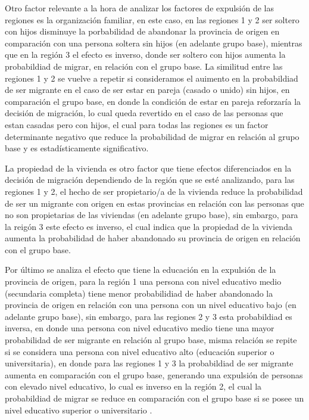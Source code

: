 \documentclass[12pt,a4paper]{article}
\begin{document}
Otro factor relevante a la hora de analizar los factores de expulsión de las regiones es la organización familiar, en este caso, en las regiones 1 y 2 ser soltero con hijos disminuye la porbabilidad de abandonar la provincia de origen en comparación con una persona soltera sin hijos (en adelante grupo base), mientras que en la región 3 el efecto es inverso, donde ser soltero con hijos aumenta la probabildiad de migrar, en relación con el grupo base.
La similitud entre las regiones 1 y 2 se vuelve a repetir si consideramos el auimento en la probabildiad de ser migrante en el caso de ser estar en pareja (casado o unido) sin hijos, en comparación el grupo base, en donde la condición de estar en pareja reforzaría la decisión de migración, lo cual queda revertido en el caso de las personas que estan casadas pero con hijos, el cual para todas las regiones es un factor determinante negativo que reduce la probabilidad de migrar en relación al grupo base y es estadísticamente significativo.

La propiedad de la vivienda es otro factor que tiene efectos diferenciados en la decisión de migración dependiendo de la región que se esté analizando, para las regiones 1 y 2, el hecho de ser propietario/a de la vivienda reduce la probabilidad de ser un migrante con origen en estas provincias en relación con las personas que no son propietarias de las viviendas (en adelante grupo base), sin embargo, para la reigón 3 este efecto es inverso, el cual indica que la propiedad de la vivienda aumenta la probabilidad de haber abandonado su provincia de origen en relación con el grupo base.

Por último se analiza el efecto que tiene la educación en la expulsión de la provincia de origen, para la región 1  una persona con nivel educativo medio (secundaria completa) tiene menor probabilidiad de haber abandonado la provincia de origen en relación con una persona con un nivel educativo bajo (en adelante grupo base), sin embargo, para las regiones 2 y 3 esta probabildiad es inversa, en donde una persona con nivel educativo medio tiene una mayor probabilidad de ser migrante en relación al grupo base, misma relación se repite si se considera una persona con nivel educativo alto (educación superior o universitaria), en donde para las regiones 1 y 3 la probabildiad de ser migrante aumenta en comparación con el grupo base, generando una expulsión de personas con elevado nivel educativo, lo cual es inverso en la región 2, el cual la probabildiad de migrar se reduce en comparación con el grupo base si se posee un nivel educativo superior o universitario .
\end{document}
